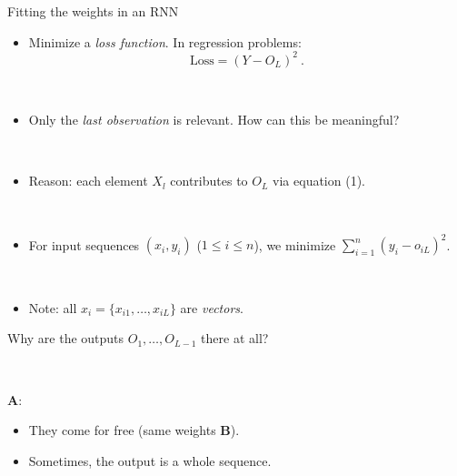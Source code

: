\documentclass[
  10pt,
  ignorenonframetext,
  twocolumn]{beamer}
\providecommand{\tightlist}{%
  \setlength{\itemsep}{0pt}\setlength{\parskip}{0pt}}
\begin{document}
\begin{frame}
\begin{block}{Fitting the weights in an RNN}
\label{fitting-the-weights-in-an-rnn}
\(~\)

\begin{itemize}
\tightlist
\item
  Minimize a \emph{loss function}. In regression problems:
  \[\text{Loss} = (Y- O_L)^2 \ . \]
\end{itemize}

\(~\)

\begin{itemize}
\tightlist
\item
  Only the \emph{last observation} is relevant. How can this be
  meaningful?
\end{itemize}

\(~\)

\begin{itemize}
\tightlist
\item
  Reason: each element \(X_l\) contributes to \(O_L\) via equation (1).
\end{itemize}

\(~\)

\begin{itemize}
\tightlist
\item
  For input sequences \((x_i,y_i)\) (\(1\leq i \leq n\)), we minimize
  \(\sum_{i=1}^n (y_i - o_{iL})^2\).
\end{itemize}

\(~\)

\begin{itemize}
\tightlist
\item
  Note: all \(x_i = \{ x_{i1}, \ldots, x_{iL} \}\) are \emph{vectors}.
\end{itemize}
\end{block}
\end{frame}

\begin{frame}
Why are the outputs \(O_1, \ldots, O_{L-1}\) there at all?

\(~\)

\pause

\textbf{A}:

\begin{itemize}
\item
  They come for free (same weights \(\boldsymbol{B}\)).
\item
  Sometimes, the output is a whole sequence.
\end{itemize}
\end{frame}
\end{document}
